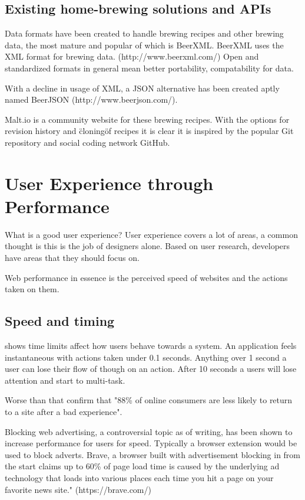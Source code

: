 \subsection{Existing home-brewing solutions and APIs}

Data formats have been created to handle brewing recipes and other brewing data, the most mature and popular of which is BeerXML. BeerXML uses the XML format for brewing data. (http://www.beerxml.com/) Open and standardized formats in general mean better portability, compatability for data. \cite{beerxml}

With a decline in usage of XML, a JSON alternative has been created aptly named BeerJSON (http://www.beerjson.com/). \cite{beerjson}

Malt.io is a community website for these brewing recipes. With the options for revision history and \"cloning\" of recipes it is clear it is inspired by the popular Git repository and social coding network GitHub. \cite{malt.io}

\section{User Experience through Performance} \label{l-r--user-experience-performance}

What is a good user experience? User experience covers a lot of areas, a common thought is this is the job of designers alone. Based on user research, developers have areas that they should focus on.

Web performance in essence is the perceived speed of websites and the actions taken on them.


\subsection{Speed and timing}

\cite{usability_engineering} shows time limits affect how users behave towards a system. An application feels instantaneous with actions taken under 0.1 seconds.  Anything over 1 second a user can lose their flow of though on an action. After 10 seconds a users will lose attention and start to multi-task.

Worse than that \cite{why_web_performance_matters} confirm that "88\% of online consumers are less likely to return to a site after a bad experience".

Blocking web advertising, a controversial topic as of writing, has been shown to increase performance for users for speed. Typically a browser extension would be used to block adverts. Brave, a browser built with advertisement blocking in from the start claims up to 60\% of page load time is caused by the underlying ad technology that loads into various places each time you hit a page on your favorite news site." (https://brave.com/)

